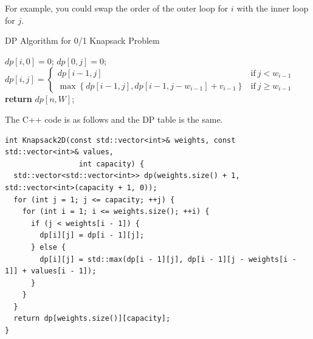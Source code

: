 For example, you could swap the order of the outer loop for $i$ with the inner loop for $j$.
\begin{algorithm}[H]\label{algorithm:01_knapsack_problem_2}
\caption{DP Algorithm for 0/1 Knapsack Problem}
\begin{algorithmic}[1]
 
    \State $dp[i, 0] = 0$;
\EndFor
{}  
    \State $dp[0, j] = 0$;
\EndFor
\For{{\color{magenta}{$j = 1$ to $W$}}}
    \For{{\color{magenta}{$i = 1$ to $n$}}}
        \State 
        $dp[i, j] = 
        \begin{cases} 
            dp[i - 1, j] & \text{if}\ j < w_{i-1}\\
            \max\left\{dp[i - 1, j], dp[i - 1, j - w_{i-1}] + v_{i-1}\right\} & \text{if}\ j \geq w_{i-1}
        \end{cases}$
    \EndFor
\EndFor
\State \textbf{return} $dp[n, W]$;
\end{algorithmic}
\end{algorithm}

The C++ code is as follows and the DP table is the same.
\begin{lstlisting}
int Knapsack2D(const std::vector<int>& weights, const std::vector<int>& values,
                 int capacity) {
  std::vector<std::vector<int>> dp(weights.size() + 1, std::vector<int>(capacity + 1, 0));
  for (int j = 1; j <= capacity; ++j) {
    for (int i = 1; i <= weights.size(); ++i) {
      if (j < weights[i - 1]) {
        dp[i][j] = dp[i - 1][j];
      } else {
        dp[i][j] = std::max(dp[i - 1][j], dp[i - 1][j - weights[i - 1]] + values[i - 1]);
      }
    }
  }
  return dp[weights.size()][capacity];
}
\end{lstlisting}

